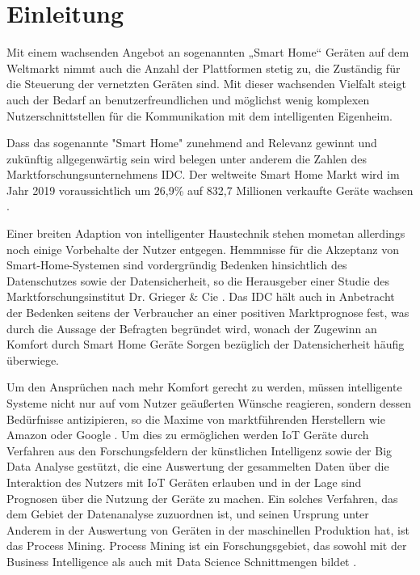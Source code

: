 \chapter{Einleitung}\label{chap:introduction}
Mit einem wachsenden Angebot an sogenannten „Smart Home“ Geräten auf dem Weltmarkt nimmt auch die Anzahl der Plattformen stetig zu, die Zuständig für die Steuerung der vernetzten Geräten sind. Mit dieser wachsenden Vielfalt steigt auch der Bedarf an benutzerfreundlichen und möglichst wenig komplexen Nutzerschnittstellen für die Kommunikation mit dem intelligenten Eigenheim. 

Dass das sogenannte "Smart Home" zunehmend and Relevanz gewinnt und zukünftig allgegenwärtig sein wird belegen unter anderem die Zahlen des  Marktforschungsunternehmens IDC. Der weltweite Smart Home Markt wird im Jahr 2019 voraussichtlich um 26,9\% auf 832,7 Millionen verkaufte Geräte wachsen \cite{IDC}.
 
Einer breiten Adaption von intelligenter Haustechnik stehen mometan allerdings noch einige Vorbehalte der Nutzer entgegen.
Hemmnisse für die Akzeptanz von Smart-Home-Systemen sind vordergründig Bedenken hinsichtlich des Datenschutzes sowie der Datensicherheit, so die Herausgeber einer Studie des Marktforschungsinstitut Dr. Grieger \& Cie \cite{griegercie}. Das IDC hält auch in Anbetracht der Bedenken seitens der Verbraucher an einer positiven Marktprognose fest, was durch die Aussage der Befragten begründet wird, wonach der Zugewinn an Komfort durch Smart Home Geräte Sorgen bezüglich der Datensicherheit häufig überwiege.
 
Um den Ansprüchen nach mehr Komfort gerecht zu werden, müssen intelligente Systeme nicht nur auf vom Nutzer geäußerten Wünsche reagieren, sondern dessen Bedürfnisse antizipieren, so die Maxime von marktführenden Herstellern wie Amazon oder Google \cite{IoTGoogle}. Um dies zu ermöglichen werden IoT Geräte durch Verfahren aus den Forschungsfeldern der künstlichen Intelligenz sowie der Big Data Analyse gestützt, die eine Auswertung der gesammelten Daten über die Interaktion des Nutzers mit IoT Geräten erlauben und in der Lage sind Prognosen über die Nutzung der Geräte zu machen. 
\newpage
Ein solches Verfahren, das dem Gebiet der Datenanalyse zuzuordnen ist, und seinen Ursprung unter Anderem in der Auswertung von Geräten in der maschinellen Produktion hat, ist das Process Mining. Process Mining ist ein Forschungsgebiet, das sowohl mit der Business Intelligence als auch mit Data Science Schnittmengen bildet \cite{PMinAction}. 

